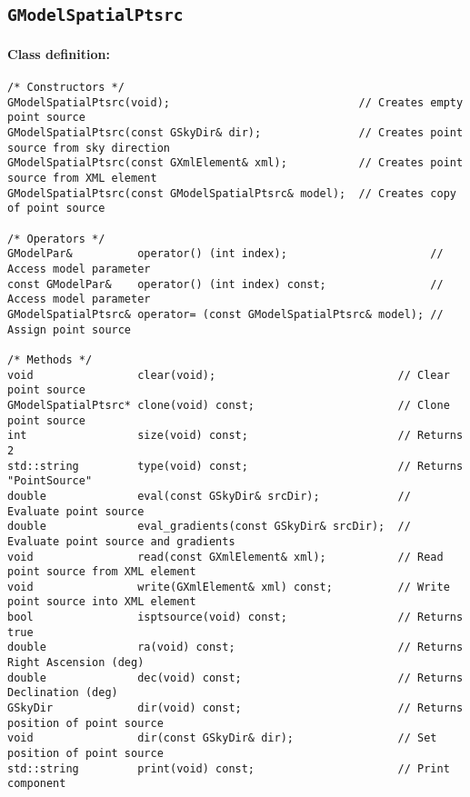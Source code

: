 \documentclass{article}[12pt,a4]
\begin{document}
\newpage
\subsection{{\tt GModelSpatialPtsrc}}

\paragraph{Class definition:}
\begin{verbatim}
/* Constructors */
GModelSpatialPtsrc(void);                             // Creates empty point source
GModelSpatialPtsrc(const GSkyDir& dir);               // Creates point source from sky direction
GModelSpatialPtsrc(const GXmlElement& xml);           // Creates point source from XML element
GModelSpatialPtsrc(const GModelSpatialPtsrc& model);  // Creates copy of point source

/* Operators */
GModelPar&          operator() (int index);                      // Access model parameter
const GModelPar&    operator() (int index) const;                // Access model parameter
GModelSpatialPtsrc& operator= (const GModelSpatialPtsrc& model); // Assign point source

/* Methods */
void                clear(void);                            // Clear point source
GModelSpatialPtsrc* clone(void) const;                      // Clone point source
int                 size(void) const;                       // Returns 2
std::string         type(void) const;                       // Returns "PointSource"
double              eval(const GSkyDir& srcDir);            // Evaluate point source
double              eval_gradients(const GSkyDir& srcDir);  // Evaluate point source and gradients
void                read(const GXmlElement& xml);           // Read point source from XML element
void                write(GXmlElement& xml) const;          // Write point source into XML element
bool                isptsource(void) const;                 // Returns true
double              ra(void) const;                         // Returns Right Ascension (deg)
double              dec(void) const;                        // Returns Declination (deg)
GSkyDir             dir(void) const;                        // Returns position of point source
void                dir(const GSkyDir& dir);                // Set position of point source
std::string         print(void) const;                      // Print component
\end{verbatim}
\end{document}
